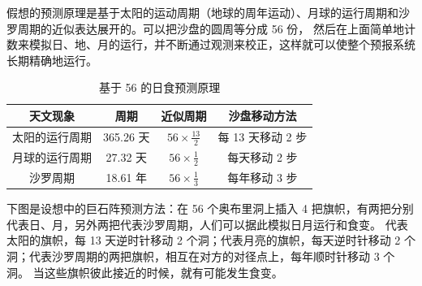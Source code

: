 \documentclass[a4paper,12pt]{article}
\numberwithin{problem}{section}
\numberwithin{definition}{section}
\numberwithin{lemma}{section}
\numberwithin{proposition}{section}
\numberwithin{theorem}{section}
\numberwithin{grammar}{section}
\numberwithin{program}{section}
\numberwithin{convention}{section}
\numberwithin{corollary}{section}
\begin{document}
假想的预测原理是基于太阳的运动周期（地球的周年运动）、月球的运行周期和沙罗周期的近似表达展开的。可以把沙盘的圆周等分成 56 份，
然后在上面简单地计数来模拟日、地、月的运行，并不断通过观测来校正，这样就可以使整个预报系统长期精确地运行。\cite{beggs2012unifying}

\begin{table}[tbhp]
\centering
\begin{tabular}{|c|c|c|c|}
\hline
天文现象 & 周期 & 近似周期 & 沙盘移动方法 \\
\hline
太阳的运行周期 & 365.26 天 & $ 56 \times \frac{13}{2} $ & 每 13 天移动 2 步 \\
\hline
月球的运行周期 & 27.32 天 & $ 56 \times \frac{1}{2} $  & 每天移动 2 步 \\
\hline
沙罗周期 & 18.61 年 & $ 56 \times \frac{1}{3} $  & 每年移动 3 步 \\
\hline
\end{tabular}
\caption{基于 56 的日食预测原理}
\end{table}

下图是设想中的巨石阵预测方法：在 56 个奥布里洞上插入 4 把旗帜，有两把分别代表日、月，另外两把代表沙罗周期，人们可以据此模拟日月运行和食变。
代表太阳的旗帜，每 13 天逆时针移动 2 个洞；代表月亮的旗帜，每天逆时针移动 2 个洞；代表沙罗周期的两把旗帜，相互在对方的对径点上，每年顺时针移动 3 个洞。
当这些旗帜彼此接近的时候，就有可能发生食变。
\end{document}
